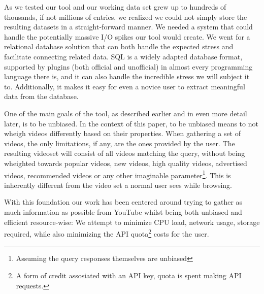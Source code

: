 As we tested our tool and our working data set grew up to hundreds of thousands,
if not millions of entries, we realized we could not simply store the resulting
datasets in a straight-forward manner. We needed a system that could handle the
potentially massive I/O spikes our tool would create. We went for a relational database
solution that can both handle the expected stress and facilitate connecting
related data. SQL is a widely adapted database format, supported by plugins
(both official and unofficial) in almost every programming language there is,
and it can also handle the incredible stress we will subject it to. Additionally,
it makes it easy for even a novice user to extract meaningful data from the
database.

One of the main goals of the tool, as described earlier and in even more detail
later, is to be unbiased. In the context of this paper, to be unbiased means
to not wheigh videos differently based on their properties. When gathering a
set of videos, the only limitations, if any, are the ones provided by the user.
The resulting videoset will consist of all videos matching the query, without
being wheighted towards popular videos, new videos, high quality videos, 
advertised videos, recommended videos or any other imaginable
parameter\footnote{Assuming the query responses themselves are unbiased}. This
is inherently different from the video set a normal user sees while browsing.

With this foundation our work has been centered around trying to gather as much
information as possible from YouTube whilst being both unbiased and efficient
resource-wise: We attempt to minimize CPU load, network usage, storage required,
while also minimizing the API quota\footnote{A form of credit assosiated with an API key, quota is spent making API requests.} costs for the user.


